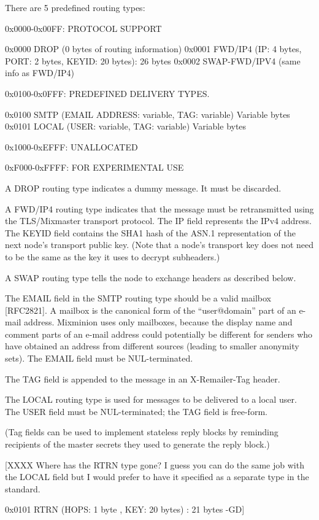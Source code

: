There are 5 predefined routing types:

0x0000-0x00FF: PROTOCOL SUPPORT

0x0000 DROP    (0 bytes of routing information)
0x0001 FWD/IP4 (IP: 4 bytes, PORT: 2 bytes, KEYID: 20 bytes): 26 bytes
0x0002 SWAP-FWD/IPV4 (same info as FWD/IP4)

0x0100-0x0FFF: PREDEFINED DELIVERY TYPES.

0x0100 SMTP   (EMAIL ADDRESS: variable, TAG: variable) Variable bytes
0x0101 LOCAL  (USER: variable, TAG: variable) Variable bytes

0x1000-0xEFFF: UNALLOCATED

0xF000-0xFFFF: FOR EXPERIMENTAL USE

A DROP routing type indicates a dummy message. It must be discarded.

A FWD/IP4 routing type indicates that the message must be
retransmitted using the TLS/Mixmaster transport protocol. The IP field
represents the IPv4 address.  The KEYID field contains the SHA1 hash
of the ASN.1 representation of the next node's transport public key.
(Note that a node's transport key does not need to be the same as the
key it uses to decrypt subheaders.)

A SWAP routing type tells the node to exchange headers as described below.

The EMAIL field in the SMTP routing type should be a valid mailbox
[RFC2821]. A mailbox is the canonical form of the ``user@domain''
part of an e-mail address. Mixminion uses only mailboxes, because the
display name and comment parts of an e-mail address could potentially be
different for senders who have obtained an address from different
sources (leading to smaller anonymity sets). The EMAIL field must be
NUL-terminated.

The TAG field is appended to the message in an X-Remailer-Tag header.

The LOCAL routing type is used for messages to be delivered to a local
user.  The USER field must be NUL-terminated; the TAG field is
free-form.

(Tag fields can be used to implement stateless reply blocks by
reminding recipients of the master secrets they used to generate the
reply block.)

[XXXX Where has the RTRN type gone? I guess you can do the same job
with the LOCAL field but I would prefer to have it specified as a
separate type in the standard. 

0x0101 RTRN  (HOPS: 1 byte , KEY: 20 bytes) : 21 bytes -GD]

